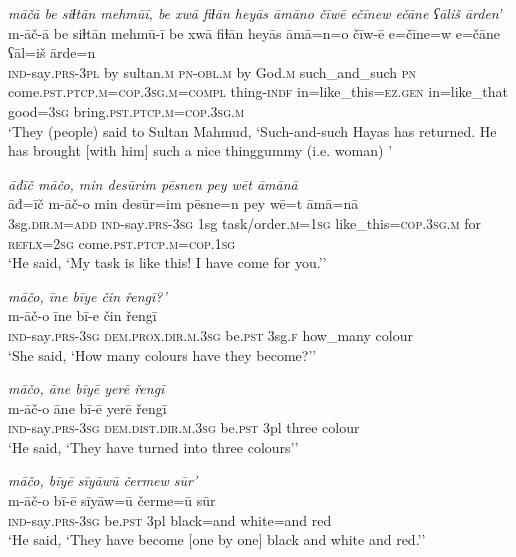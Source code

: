 \ea \label{ŽH.66}
\textit{māčā be siɫtān mehmūī, be xwā fiɫān heyās āmāno čīwē ečīnew ečāne ʕāliš ārden’} \\ 
\gll m-āč-ā be siɫtān mehmū-ī be xwā fiɫān heyās āmā=n=o čīw-ē e=čīne=w e=čāne ʕāl=iš ārde=n \\ 
 \textsc{ind-}say\textsc{.prs}\textsc{-3pl} by sultan\textsc{.m} \textsc{pn}\textsc{-obl}\textsc{.m} by God\textsc{.m} such\_and\_such \textsc{pn} come\textsc{.pst}\textsc{.ptcp}\textsc{.m}\textsc{=cop}\textsc{.3sg}\textsc{.m}\textsc{=compl} thing\textsc{-indf} in=like\_this\textsc{=ez}\textsc{.gen} in=like\_that good\textsc{=3sg} bring\textsc{.pst}\textsc{.ptcp}\textsc{.m}\textsc{=cop}\textsc{.3sg}\textsc{.m} \\ 
\glt `They (people) said to Sultan Mahmud, ‘Such-and-such Hayas has returned. He has brought [with him] such a nice thinggummy (i.e. woman)  '
\z 
 
\ea \label{ŽH.78}
\textit{āđīč māčo, min desūrim pēsnen pey wēt āmānā} \\ 
\gll āđ=īč m-āč-o min desūr=im pēsne=n pey wē=t āmā=nā \\ 
 3sg\textsc{.dir}\textsc{.m}\textsc{=add} \textsc{ind-}say\textsc{.prs}\textsc{-3sg} 1sg task/order\textsc{.m}\textsc{=1sg} like\_this\textsc{=cop}\textsc{.3sg}\textsc{.m} for \textsc{reflx}\textsc{=\textsc{2sg}} come\textsc{.pst}\textsc{.ptcp}\textsc{.m}\textsc{=cop}\textsc{.1sg} \\ 
\glt `He said, ‘My task is like this! I have come for you.’'
\z 
 
\ea \label{ŽH.88}
\textit{māčo, īne bīye čin řengī?’} \\ 
\gll m-āč-o īne bī-e čin řengī \\ 
 \textsc{ind-}say\textsc{.prs}\textsc{-3sg} \textsc{dem.prox}\textsc{.dir}\textsc{.m}\textsc{.3sg} be\textsc{.pst} 3sg\textsc{\textsc{.f}} how\_many colour \\ 
\glt `She said, ‘How many colours have they become?’'
\z 
 
\ea \label{ŽH.89}
\textit{māčo, āne bīyē yerē řengī} \\ 
\gll m-āč-o āne bī-ē yerē řengī \\ 
 \textsc{ind-}say\textsc{.prs}\textsc{-3sg} \textsc{dem.dist}\textsc{.dir}\textsc{.m}\textsc{.3sg} be\textsc{.pst} 3pl three colour \\ 
\glt `He said, ‘They have turned into three colours’'
\z 
 
\ea \label{ŽH.91}
\textit{māčo, bīyē sīyāwū čermew sūr’} \\ 
\gll m-āč-o bī-ē sīyāw=ū čerme=ū sūr \\ 
 \textsc{ind-}say\textsc{.prs}\textsc{-3sg} be\textsc{.pst} 3pl black=and white=and red \\ 
\glt `He said, ‘They have become [one by one] black and white and red.’'
\z 
 
